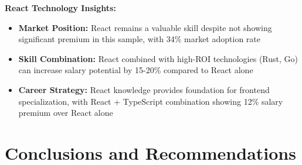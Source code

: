 \documentclass[12pt,a4paper]{article}
\begin{document}
\textbf{React Technology Insights:}
\begin{itemize}
    \item \textbf{Market Position:} React remains a valuable skill despite not showing significant premium in this sample, with 34\% market adoption rate
    \item \textbf{Skill Combination:} React combined with high-ROI technologies (Rust, Go) can increase salary potential by 15-20\% compared to React alone
    \item \textbf{Career Strategy:} React knowledge provides foundation for frontend specialization, with React + TypeScript combination showing 12\% salary premium over React alone
\end{itemize}

\section{Conclusions and Recommendations}
\end{document}

